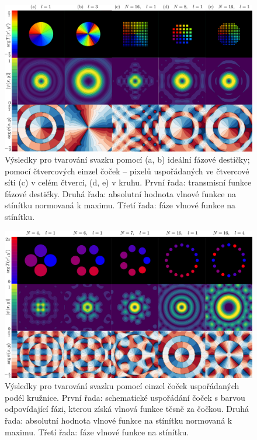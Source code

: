 \documentclass[a4paper,11pt]{article}
\begin{document}
\begin{figure}
    \centering
    \includegraphics[width = \linewidth]{idealka_pixely_vysledek.png}
    \caption{Výsledky pro tvarování svazku pomocí (a, b) ideální fázové destičky; pomocí čtvercových einzel čoček -- pixelů uspořádaných ve čtvercové síti (c) v celém čtverci, (d, e) v kruhu. První řada: transmisní funkce fázové destičky. Druhá řada: absolutní hodnota vlnové funkce na stínítku normovaná k maximu. Třetí řada: fáze vlnové funkce na stínítku.}
    \label{fig:einzel_ideal}
\end{figure}

\begin{figure}
    \centering
    \includegraphics[width = \linewidth]{einzel_vysledek.png}
    \caption{Výsledky pro tvarování svazku pomocí einzel čoček uspořádaných podél kružnice. První řada: schematické uspořádání čoček s barvou odpovídající fázi, kterou získá vlnová funkce těsně za čočkou.  Druhá řada: absolutní hodnota vlnové funkce na stínítku normovaná k maximu. Třetí řada: fáze vlnové funkce na stínítku.}
    \label{fig:einzel_vysledek}
\end{figure}
\end{document}
